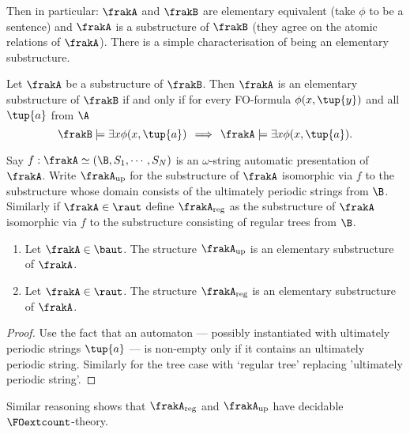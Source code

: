 Then in particular: $\frakA$ and $\frakB$ are elementary equivalent (take $\phi$ to be a sentence) 
and $\frakA$ is a substructure of $\frakB$ (they agree on the atomic relations of $\frakA$).
There is a simple characterisation of being an elementary substructure.

\begin{lemma}
Let $\frakA$ be a substructure of $\frakB$.
Then $\frakA$ is an elementary substructure of $\frakB$ if and only if  for every FO-formula $\phi(x,\tup{y})$ and all $\tup{a}$ from $\A$
\[
\frakB \models \exists x \phi(x,\tup{a}) \,  \implies\,  \frakA \models \exists x \phi(x,\tup{a}).
\]
\end{lemma}

Say $f:\frakA \simeq (\B,S_1,\cdots,S_N)$ is an $\omega$-string automatic presentation of $\frakA$. %
Write $\frakA_{\rm{up}}$ for the substructure of $\frakA$ isomorphic via $f$ to the substructure whose domain consists of the ultimately periodic strings from $\B$.
Similarly if $\frakA \in \raut$ define $\frakA_{\rm{reg}}$ as the substructure of $\frakA$ isomorphic via $f$ to the substructure consisting of regular trees from $\B$.

\begin{proposition} \cite{BKRu08,HKMN08}
\begin{enumerate}
\item Let $\frakA \in \baut$. The structure $\frakA_{\rm{up}}$ is an elementary substructure of $\frakA$.
\item Let $\frakA \in \raut$. The structure $\frakA_{\rm{reg}}$ is an elementary substructure of $\frakA$.
\end{enumerate}
\end{proposition}

\begin{proof}
Use the fact that an automaton --- possibly instantiated with ultimately periodic strings $\tup{a}$ --- is non-empty only if it contains an ultimately periodic string. Similarly for the tree case with `regular tree' replacing 'ultimately periodic string'. 
\end{proof}



Similar reasoning shows that $\frakA_{\rm{reg}}$ and $\frakA_{\rm{up}}$ have decidable $\FOextcount$-theory.




